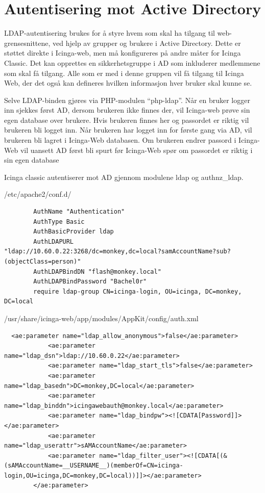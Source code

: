 \section{Autentisering mot Active Directory} 
LDAP-autentisering brukes for å styre hvem som skal ha tilgang til web-grensesnittene, ved hjelp av grupper og brukere i Active Directory. Dette er støttet direkte i Icinga-web, men må konfigureres på andre måter for Icinga Classic. Det kan opprettes en sikkerhetsgruppe i AD som inkluderer medlemmene som skal få tilgang. Alle som er med i denne gruppen vil få tilgang til Icinga Web, der det også kan defineres hvilken informasjon hver bruker skal kunne se. 

Selve LDAP-binden gjøres via PHP-modulen “php-ldap”. Når en bruker logger inn sjekkes først AD, dersom brukeren ikke finnes der, vil Icinga-web prøve sin egen database over brukere. Hvis brukeren finnes her og passordet er riktig vil brukeren bli logget inn. Når brukeren har logget inn for første gang via AD, vil brukeren bli lagret i Icinga-Web databasen. Om brukeren endrer passord i Icinga-Web vil uansett AD først bli spurt før Icinga-Web spør om passordet er riktig i sin egen database

Icinga classic autentiserer mot AD gjennom modulene ldap og authnz\_ldap.

/etc/apache2/conf.d/

\begin{lstlisting}
        AuthName "Authentication"
        AuthType Basic
        AuthBasicProvider ldap
        AuthLDAPURL
"ldap://10.60.0.22:3268/dc=monkey,dc=local?samAccountName?sub?(objectClass=person)"
        AuthLDAPBindDN "flash@monkey.local"
        AuthLDAPBindPassword "Bachel0r"
        require ldap-group CN=icinga-login, OU=icinga, DC=monkey, DC=local
\end{lstlisting}

/usr/share/icinga-web/app/modules/AppKit/config/auth.xml

\begin{lstlisting}
  <ae:parameter name="ldap_allow_anonymous">false</ae:parameter>
            <ae:parameter name="ldap_dsn">ldap://10.60.0.22</ae:parameter>
            <ae:parameter name="ldap_start_tls">false</ae:parameter>
            <ae:parameter name="ldap_basedn">DC=monkey,DC=local</ae:parameter>
            <ae:parameter name="ldap_binddn">icingawebauth@monkey.local</ae:parameter>
            <ae:parameter name="ldap_bindpw"><![CDATA[Password]]></ae:parameter>
            <ae:parameter name="ldap_userattr">sAMAccountName</ae:parameter>
            <ae:parameter name="ldap_filter_user"><![CDATA[(&(sAMAccountName=__USERNAME__)(memberOf=CN=icinga-login,OU=icinga,DC=monkey,DC=local))]]></ae:parameter>
        </ae:parameter>
\end{lstlisting}

